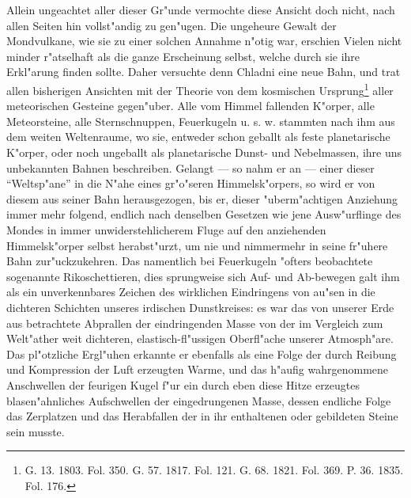 \documentclass[a4paper, 8pt, oneside, polutonikogreek, german]{article}
\begin{document}
Allein ungeachtet aller dieser Gr"unde vermochte diese Ansicht doch nicht, nach allen Seiten hin vollst"andig zu gen"ugen. Die ungeheure Gewalt der Mondvulkane, wie sie zu einer solchen Annahme n"otig war, erschien Vielen nicht minder r"atselhaft als die ganze Erscheinung selbst, welche durch sie ihre Erkl"arung finden sollte. Daher versuchte denn Chladni eine neue Bahn, und trat allen bisherigen Ansichten mit der Theorie von dem kosmischen Ursprung\footnote{G. 13. 1803. Fol. 350. G. 57. 1817. Fol. 121. G. 68. 1821. Fol. 369. P. 36. 1835. Fol. 176.} aller meteorischen Gesteine gegen"uber. Alle vom Himmel fallenden K"orper, alle Meteorsteine, alle Sternschnuppen, Feuerkugeln u. s. w. stammten nach ihm aus dem weiten Weltenraume, wo sie, entweder schon geballt als feste planetarische K"orper, oder noch ungeballt als planetarische Dunst- und Nebelmassen, ihre uns unbekannten Bahnen beschreiben. Gelangt --- so nahm er an --- einer dieser "`Weltsp"ane"' in die N"ahe eines gr"o"seren Himmelsk"orpers, so wird er von diesem aus seiner Bahn herausgezogen, bis er, dieser "uberm"achtigen Anziehung immer mehr folgend, endlich nach denselben Gesetzen wie jene Ausw"urflinge des Mondes in immer unwiderstehlicherem Fluge auf den anziehenden Himmelsk"orper selbst herabst"urzt, um nie und nimmermehr in seine fr"uhere Bahn zur"uckzukehren. Das namentlich bei Feuerkugeln "ofters beobachtete sogenannte Rikoschettieren, dies sprungweise sich Auf- und Ab-bewegen galt ihm als ein unverkennbares Zeichen des wirklichen Eindringens von au"sen in die dichteren Schichten unseres irdischen Dunstkreises: es war das von unserer Erde aus betrachtete Abprallen der eindringenden Masse von der im Vergleich zum Welt"ather weit dichteren, elastisch-fl"ussigen Oberfl"ache unserer Atmosph"are. Das pl"otzliche Ergl"uhen erkannte er ebenfalls als eine Folge der durch Reibung und Kompression der Luft erzeugten Warme, und das h"aufig wahrgenommene Anschwellen der feurigen Kugel f"ur ein durch eben diese Hitze erzeugtes blasen"ahnliches Aufschwellen der eingedrungenen Masse, dessen endliche Folge das Zerplatzen und das Herabfallen der in ihr enthaltenen oder gebildeten Steine sein musste.
\end{document}
